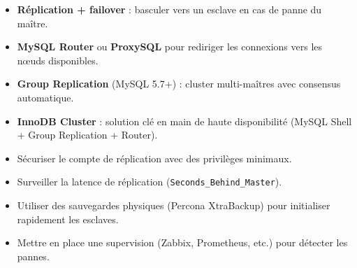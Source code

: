 \documentclass[a4paper,11pt]{article}
\begin{document}
\begin{tcolorbox}[colback=orange!5!white,colframe=orange!75!black,title=Haute disponibilité avec MySQL]
\begin{itemize}
  \item \textbf{Réplication + failover} : basculer vers un esclave en cas de panne du maître.
  \item \textbf{MySQL Router} ou \textbf{ProxySQL} pour rediriger les connexions vers les nœuds disponibles.
  \item \textbf{Group Replication} (MySQL 5.7+) : cluster multi-maîtres avec consensus automatique.
  \item \textbf{InnoDB Cluster} : solution clé en main de haute disponibilité (MySQL Shell + Group Replication + Router).
\end{itemize}
\end{tcolorbox}

\begin{tcolorbox}[colback=red!5!white,colframe=red!75!black,title=Bonnes pratiques réplication et HA]
\begin{itemize}
  \item Sécuriser le compte de réplication avec des privilèges minimaux.
  \item Surveiller la latence de réplication (\texttt{Seconds\_Behind\_Master}).
  \item Utiliser des sauvegardes physiques (Percona XtraBackup) pour initialiser rapidement les esclaves.
  \item Mettre en place une supervision (Zabbix, Prometheus, etc.) pour détecter les pannes.
\end{itemize}
\end{tcolorbox}
\end{document}
